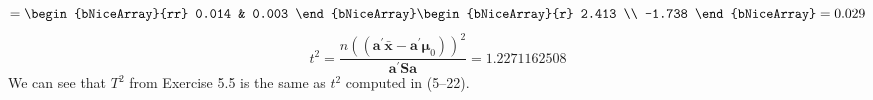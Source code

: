 \[
    =
    \begin{bNiceArray}{rr}
        0.014 & 0.003
    \end{bNiceArray}
    \begin{bNiceArray}{r}
        2.413 \\
        -1.738
    \end{bNiceArray}
    =
    0.029
\]
\[
    t^{2}
    =
    \frac{
            n
            {\left(
                \left(
                    \textbf{a}^{\prime}\bar{\textbf{x}}
                    -
                    \textbf{a}^{\prime}\bm{\mu}_{0}
                \right)
            \right)}^{2}
        }{
            \textbf{a}^{\prime}
            \textbf{S}
            \textbf{a}}
    =
    1.2271162508
\]
We can see that $T^{2}$ from Exercise 5.5 is the same as $t^{2}$ computed in (5--22).